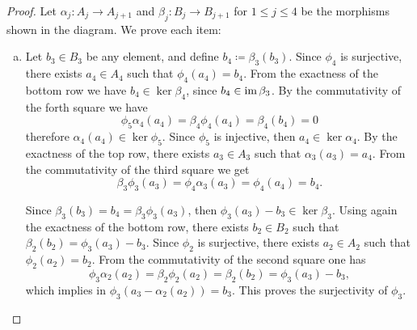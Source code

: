 \begin{proof}
    Let \(\alpha_j: A_j \to A_{j+1}\) and \(\beta_j: B_j \to B_{j+1}\) for
    \(1 \leq j \leq 4\) be the morphisms shown in the diagram. We prove each item:
    \begin{enumerate}[(a)]\setlength\itemsep{0em}
        \item Let \(b_3 \in B_3\) be any element, and define \(b_4 \coloneq
              \beta_3(b_3)\). Since \(\phi_4\) is surjective, there exists \(a_4 \in A_4\)
              such that \(\phi_4(a_4) = b_4\). From the exactness of the bottom row we have
              \(b_4 \in \ker \beta_4\), since \(b_4 \in \operatorname{im} \beta_3\). By the commutativity
              of the forth square we have
              \[
                  \phi_5 \alpha_4(a_4) = \beta_4 \phi_4 (a_4) = \beta_4(b_4) = 0
              \]
              therefore \(\alpha_4(a_4) \in \ker \phi_5\). Since \(\phi_5\) is injective,
              then \(a_4 \in \ker \alpha_4\). By the exactness of the top row, there exists
              \(a_3 \in A_3\) such that \(\alpha_3(a_3) = a_4\). From the commutativity of
              the third square we get
              \[
                  \beta_3 \phi_3(a_3) = \phi_4 \alpha_3(a_3) = \phi_4(a_4) = b_4.
              \]

              Since \(\beta_3(b_3) = b_4 = \beta_3 \phi_3(a_3)\), then
              \(\phi_3(a_3) - b_3 \in \ker \beta_3\). Using again the exactness of the
              bottom row, there exists \(b_2 \in B_2\) such that
              \(\beta_2(b_2) = \phi_3(a_3) - b_3\). Since \(\phi_2\) is surjective, there
              exists \(a_2 \in A_2\) such that \(\phi_2(a_2) = b_2\). From the commutativity
              of the second square one has
              \[
                  \phi_3 \alpha_2(a_2) = \beta_2 \phi_2(a_2) = \beta_2(b_2) = \phi_3(a_3) - b_3,
              \]
              which implies in \(\phi_3(a_3 - \alpha_2(a_2)) = b_3\). This proves the
              surjectivity of \(\phi_3\).


\end{enumerate}
\end{proof}
